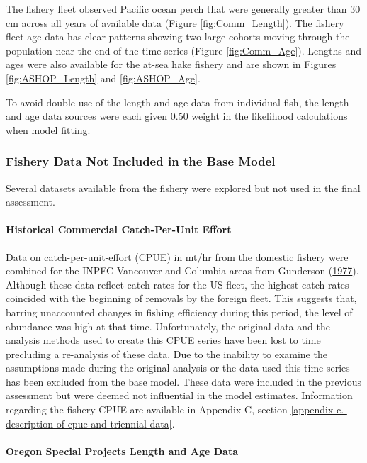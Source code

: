 \documentclass[12pt,]{article}
\let\oldparagraph\paragraph
\renewcommand{\paragraph}[1]{\oldparagraph{#1}\mbox{}}
\begin{document}
The fishery fleet observed Pacific ocean perch that were generally
greater than 30 cm across all years of available data (Figure
\ref{fig:Comm_Length}). The fishery fleet age data has clear patterns
showing two large cohorts moving through the population near the end of
the time-series (Figure \ref{fig:Comm_Age}). Lengths and ages were also
available for the at-sea hake fishery and are shown in Figures
\ref{fig:ASHOP_Length} and \ref{fig:ASHOP_Age}.

To avoid double use of the length and age data from individual fish, the
length and age data sources were each given 0.50 weight in the
likelihood calculations when model fitting.

\subsubsection{Fishery Data Not Included in the Base
Model}\label{fishery-data-not-included-in-the-base-model}

Several datasets available from the fishery were explored but not used
in the final assessment.

\paragraph{Historical Commercial Catch-Per-Unit
Effort}\label{historical-commercial-catch-per-unit-effort}

Data on catch-per-unit-effort (CPUE) in mt/hr from the domestic fishery
were combined for the INPFC Vancouver and Columbia areas from Gunderson
(\protect\hyperlink{ref-gunderson_population_1977}{1977}). Although
these data reflect catch rates for the US fleet, the highest catch rates
coincided with the beginning of removals by the foreign fleet. This
suggests that, barring unaccounted changes in fishing efficiency during
this period, the level of abundance was high at that time.
Unfortunately, the original data and the analysis methods used to create
this CPUE series have been lost to time precluding a re-analysis of
these data. Due to the inability to examine the assumptions made during
the original analysis or the data used this time-series has been
excluded from the base model. These data were included in the previous
assessment but were deemed not influential in the model estimates.
Information regarding the fishery CPUE are available in Appendix C,
section \ref{appendix-c.-description-of-cpue-and-triennial-data}.

\paragraph{Oregon Special Projects Length and Age
Data}\label{oregon-special-projects-length-and-age-data}
\end{document}
